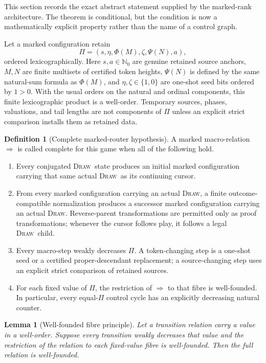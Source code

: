 \documentclass[11pt,a4paper]{article}
\newtheorem{lemma}[theorem]{Lemma}
\theoremstyle{definition}
\newtheorem{definition}[theorem]{Definition}
\theoremstyle{remark}
\newcommand{\DRAW}{\textnormal{\textsc{Draw}}}
\newcommand{\Natz}{\mathbb N_0}
\begin{document}
This section records the exact abstract statement supplied by the marked-rank
architecture.  The theorem is conditional, but the condition is now a
mathematically explicit property rather than the name of a control graph.

Let a marked configuration retain
\[
  \Pi=(s,\eta,\Phi(M),\zeta,\Psi(N),a),
\]
ordered lexicographically.  Here $s,a\in\Natz$ are genuine retained source anchors, $M,N$ are
finite multisets of certified token heights, $\Psi(N)$ is defined by the
same natural-sum formula as $\Phi(M)$, and $\eta,\zeta\in\{1,0\}$ are
one-shot seed bits ordered by $1>0$.  With the usual orders on the natural
and ordinal components, this finite lexicographic product is a well-order.
Temporary sources, phases, valuations, and tail lengths are not components
of $\Pi$ unless an explicit strict comparison installs them as retained
data.

\begin{definition}[Complete marked-router hypothesis]
\label{def:complete-router}
A marked macro-relation $\Longrightarrow$ is called complete for this game
when all of the following hold.
\begin{enumerate}[label=(C\arabic*)]
\item Every conjugated \DRAW\ state produces an initial marked configuration
      carrying that same actual \DRAW\ as its continuing cursor.
\item From every marked configuration carrying an actual \DRAW, a finite
      outcome-compatible normalization produces a successor marked
      configuration carrying an actual \DRAW.  Reverse-parent transformations
      are permitted only as proof transformations; whenever the cursor follows
      play, it follows a legal \DRAW\ child.
\item Every macro-step weakly decreases $\Pi$.  A token-changing step is a
      one-shot seed or a certified proper-descendant replacement; a
      source-changing step uses an explicit strict comparison of retained
      sources.
\item For each fixed value of $\Pi$, the restriction of
      $\Longrightarrow$ to that fibre is well-founded.  In particular, every
      equal-$\Pi$ control cycle has an explicitly decreasing natural counter.
\end{enumerate}
\end{definition}

\begin{lemma}[Well-founded fibre principle]\label{lem:fibre}
Let a transition relation carry a value in a well-order.  Suppose every
transition weakly decreases that value and the restriction of the relation
to each fixed-value fibre is well-founded.  Then the full relation is
well-founded.
\end{lemma}
\end{document}
